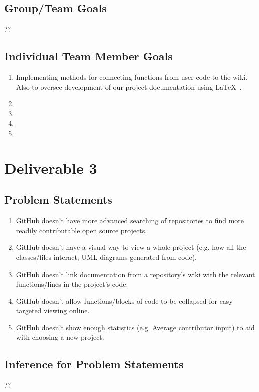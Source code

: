 \documentclass[12pt]{article}
\begin{document}
\subsection{Group/Team Goals}
??
\subsection{Individual Team Member Goals}
\begin{enumerate}
\item Implementing methods for connecting functions from user code to the wiki. Also to oversee development of our project documentation using \LaTeX\ .
\item 
\item 
\item 
\item 
\end{enumerate}

\setcounter{section}{3}
\setcounter{subsection}{0}
\section*{Deliverable 3}
\subsection{Problem Statements}
\begin{enumerate}
\item GitHub doesn't have more advanced searching of repositories to find more readily contributable open source projects.
\item GitHub doesn't have a visual way to view a whole project (e.g. how all the classes/files interact, UML diagrams generated from code).
\item GitHub doesn't link documentation from a repository's wiki with the relevant functions/lines in the project's code.
\item GitHub doesn't allow functions/blocks of code to be collapsed for easy targeted viewing online.
\item GitHub doesn't show enough statistics (e.g. Average contributor input) to aid with choosing a new project.
\end{enumerate}
\subsection{Inference for Problem Statements}
??
\end{document}

